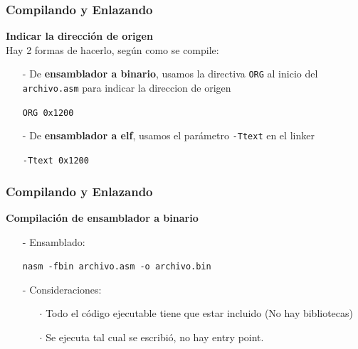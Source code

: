 \documentclass[aspectratio=169]{beamer}
\begin{document}
\begin{frame}
    \frametitle{Compilando y Enlazando}
    \textbf{Indicar la dirección de origen}\\
    \vspace{0.5cm}
    Hay 2 formas de hacerlo, según como se compile:
    \vspace{0.5cm}
    \pause
    \begin{itemize}
    \setlength\itemsep{1.8em}
    \item[-] De \textbf{ensamblador a binario}, usamos la directiva \texttt{ORG} al inicio del \texttt{archivo.asm} para indicar la direccion de origen\\
    \begin{center}
    \texttt{ORG 0x1200}
    \pause
    \end{center}
    \item[-] De \textbf{ensamblador a elf}, usamos el parámetro \texttt{-Ttext} en el linker\\
    \begin{center}
    \texttt{-Ttext 0x1200}
    \end{center}
    \end{itemize}
\end{frame}

\begin{frame}
    \frametitle{Compilando y Enlazando}
    \textbf{Compilación de ensamblador a binario}\\
    \vspace{0.5cm}
    \begin{itemize}
    \setlength\itemsep{2em}
    \item[-] \textcolor{verdeuca}{Ensamblado:}
    \begin{center}
    \texttt{nasm -fbin archivo.asm -o archivo.bin}
    \end{center}
    \item[-] \textcolor{verdeuca}{Consideraciones:}
    \vspace{0.2cm}
    \begin{itemize}
     \item[$\cdot$] Todo el código ejecutable tiene que estar incluido (No hay bibliotecas)
     \item[$\cdot$] Se ejecuta tal cual se escribió, no hay entry point.
    \end{itemize}
    \end{itemize}
\end{frame}
\end{document}
